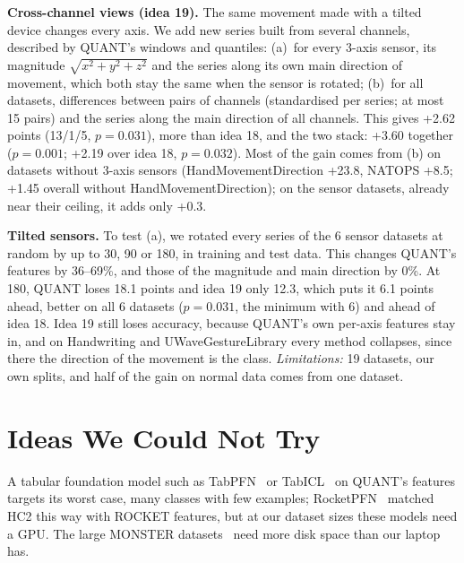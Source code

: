\documentclass[conference]{IEEEtran}
\begin{document}
\textbf{Cross-channel views (idea 19).} The same movement made with a tilted device changes every axis. We add new series built from several channels, described by QUANT's windows and quantiles: (a)~for every 3-axis sensor, its magnitude $\sqrt{x^2+y^2+z^2}$ and the series along its own main direction of movement, which both stay the same when the sensor is rotated; (b)~for all datasets, differences between pairs of channels (standardised per series; at most 15 pairs) and the series along the main direction of all channels. This gives +2.62 points (13/1/5, $p=0.031$), more than idea 18, and the two stack: +3.60 together ($p=0.001$; +2.19 over idea 18, $p=0.032$). Most of the gain comes from (b) on datasets without 3-axis sensors (HandMovementDirection +23.8, NATOPS +8.5; +1.45 overall without HandMovementDirection); on the sensor datasets, already near their ceiling, it adds only +0.3.

\textbf{Tilted sensors.} To test (a), we rotated every series of the 6 sensor datasets at random by up to 30\textdegree, 90\textdegree{} or 180\textdegree, in training and test data. This changes QUANT's features by 36--69\%, and those of the magnitude and main direction by 0\%. At 180\textdegree, QUANT loses 18.1 points and idea 19 only 12.3, which puts it 6.1 points ahead, better on all 6 datasets ($p=0.031$, the minimum with 6) and ahead of idea 18. Idea 19 still loses accuracy, because QUANT's own per-axis features stay in, and on Handwriting and UWaveGestureLibrary every method collapses, since there the direction of the movement is the class. \emph{Limitations:} 19 datasets, our own splits, and half of the gain on normal data comes from one dataset.

\section{Ideas We Could Not Try}
\label{sec:hardware}
A tabular foundation model such as TabPFN~\cite{tabpfn} or TabICL~\cite{tabicl} on QUANT's features targets its worst case, many classes with few examples; RocketPFN~\cite{rocketpfn} matched HC2 this way with ROCKET features, but at our dataset sizes these models need a GPU. The large MONSTER datasets~\cite{monster} need more disk space than our laptop has.

\end{document}

